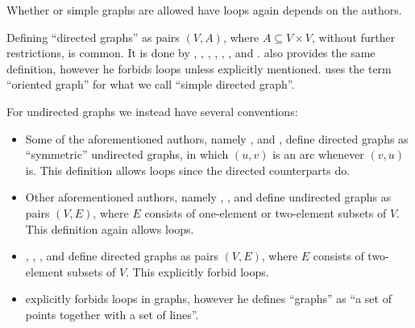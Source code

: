 \begin{remark}\label{rem:simple_graphs}
  Whether or simple graphs are allowed have loops again depends on the authors.

  Defining \enquote{directed graphs} as pairs \( (V, A) \), where \( A \subseteq V \times V \), without further restrictions, is common. It is done by , , , , , ,  and .  also provides the same definition, however he forbids loops unless explicitly mentioned.  uses the term \enquote{oriented graph} for what we call \enquote{simple directed graph}.

  For undirected graphs we instead have several conventions:
  \begin{itemize}
    \item Some of the aforementioned authors, namely ,  and , define directed graphs as \enquote{symmetric} undirected graphs, in which \( (u, v) \) is an arc whenever \( (v, u) \) is. This definition allows loops since the directed counterparts do.

    \item Other aforementioned authors, namely , , and  define undirected graphs as pairs \( (V, E) \), where \( E \) consists of one-element or two-element subsets of \( V \). This definition again allows loops.

    \item {}, , ,  and  define directed graphs as pairs \( (V, E) \), where \( E \) consists of two-element subsets of \( V \). This explicitly forbid loops.

    \item {} explicitly forbids loops in graphs, however he defines \enquote{graphs} as \enquote{a set of points together with a set of lines}.
  \end{itemize}


\end{remark}

